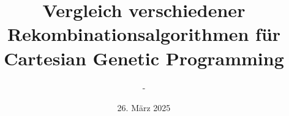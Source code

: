 \def\thetitle{Vergleich verschiedener Rekombinationsalgorithmen für Cartesian Genetic Programming}
\def\theauthor{-}
\def\thedate{26. März 2025}


\title{\thetitle}
\author{\theauthor}
\date{\thedate}
